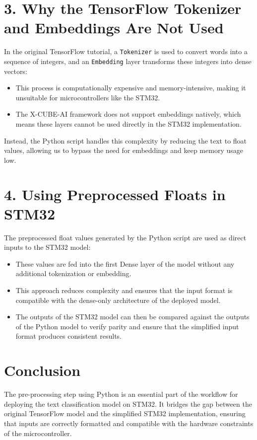 \documentclass{article}
\begin{document}
\section*{3. Why the TensorFlow Tokenizer and Embeddings Are Not Used}
In the original TensorFlow tutorial, a \texttt{Tokenizer} is used to convert words into a sequence of integers, and an \texttt{Embedding} layer transforms these integers into dense vectors:
\begin{itemize}
    \item This process is computationally expensive and memory-intensive, making it unsuitable for microcontrollers like the STM32.
    \item The X-CUBE-AI framework does not support embeddings natively, which means these layers cannot be used directly in the STM32 implementation.
\end{itemize}
Instead, the Python script handles this complexity by reducing the text to float values, allowing us to bypass the need for embeddings and keep memory usage low.

\section*{4. Using Preprocessed Floats in STM32}
The preprocessed float values generated by the Python script are used as direct inputs to the STM32 model:
\begin{itemize}
    \item These values are fed into the first Dense layer of the model without any additional tokenization or embedding.
    \item This approach reduces complexity and ensures that the input format is compatible with the dense-only architecture of the deployed model.
    \item The outputs of the STM32 model can then be compared against the outputs of the Python model to verify parity and ensure that the simplified input format produces consistent results.
\end{itemize}

\section*{Conclusion}
The pre-processing step using Python is an essential part of the workflow for deploying the text classification model on STM32. It bridges the gap between the original TensorFlow model and the simplified STM32 implementation, ensuring that inputs are correctly formatted and compatible with the hardware constraints of the microcontroller.
\end{document}
